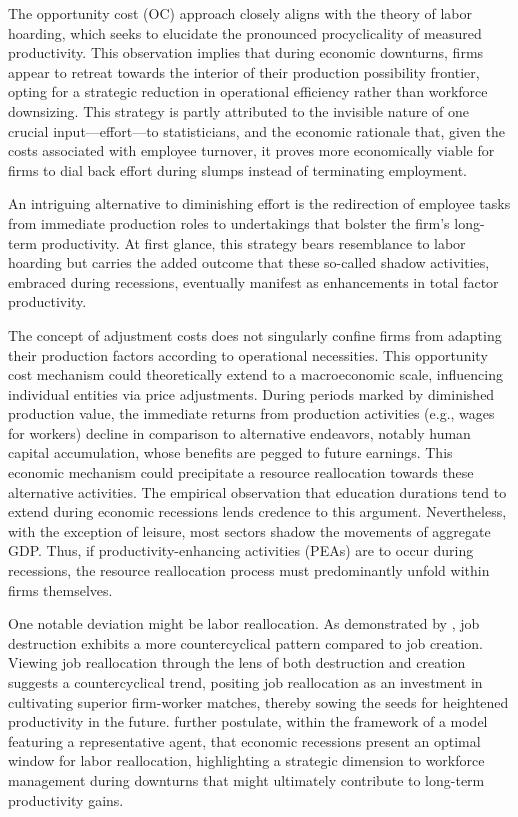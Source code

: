 \documentclass[12pt]{article}
\begin{document}
The opportunity cost (OC) approach closely aligns with the theory of labor hoarding, which seeks to elucidate the
pronounced procyclicality of measured productivity. This observation implies that during economic downturns, firms
appear to retreat towards the interior of their production possibility frontier, opting for a strategic reduction in
operational efficiency rather than workforce downsizing. This strategy is partly attributed to the invisible nature of
one crucial input—effort—to statisticians, and the economic rationale that, given the costs associated with employee
turnover, it proves more economically viable for firms to dial back effort during slumps instead of terminating
employment. 

An intriguing alternative to diminishing effort is the redirection of employee tasks from immediate production roles to
undertakings that bolster the firm's long-term productivity. At first glance, this strategy bears resemblance to labor
hoarding but carries the added outcome that these so-called shadow activities, embraced during recessions, eventually
manifest as enhancements in total factor productivity. 

The concept of adjustment costs does not singularly confine firms from adapting their production factors according to
operational necessities. This opportunity cost mechanism could theoretically extend to a macroeconomic scale,
influencing individual entities via price adjustments. During periods marked by diminished production value, the
immediate returns from production activities (e.g., wages for workers) decline in comparison to alternative endeavors,
notably human capital accumulation, whose benefits are pegged to future earnings. This economic mechanism could
precipitate a resource reallocation towards these alternative activities. The empirical observation that education
durations tend to extend during economic recessions lends credence to this argument. Nevertheless, with the exception of
leisure, most sectors shadow the movements of aggregate GDP. Thus, if productivity-enhancing activities (PEAs) are to
occur during recessions, the resource reallocation process must predominantly unfold within firms themselves. 

One notable deviation might be labor reallocation. As demonstrated by \cite{DavHalt92}, job destruction exhibits a
more countercyclical pattern compared to job creation. Viewing job reallocation through the lens of both destruction and
creation suggests a countercyclical trend, positing job reallocation as an investment in cultivating superior
firm-worker matches, thereby sowing the seeds for heightened productivity in the future. \cite{DavHalt92}further
postulate, within the framework of a model featuring a representative agent, that economic recessions present an optimal
window for labor reallocation, highlighting a strategic dimension to workforce management during downturns that might
ultimately contribute to long-term productivity gains. 
 
\end{document}
